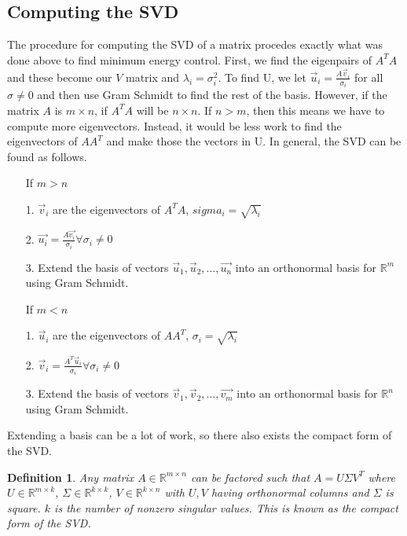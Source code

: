 \documentclass{article}
\newtheorem{definition}{Definition}
\begin{document}
\subsection{Computing the SVD}
The procedure for computing the SVD of a matrix procedes exactly what was done above to find minimum energy control.
First, we find the eigenpairs of $A^TA$ and these become our $V$ matrix and $\lambda_i=\sigma_i^2$. To find U, we let $\vec{u}_i=\frac{A\vec{v}_i}{\sigma_i}$ for all $\sigma \ne 0$ and then use Gram Schmidt to find the rest of the basis.
However, if the matrix $A$ is $m \times n$, if $A^TA$ will be $n \times n$. If $n > m$, then this means we have to compute more eigenvectors. Instead, it would be less work to find the eigenvectors of $AA^T$ and make those the vectors in U.
In general, the SVD can be found as follows.
\begin{itemize}
    \item[] If $m > n$
    \item[1. ] $\vec{v}_i$ are the eigenvectors of $A^TA$, $sigma_i=\sqrt{\lambda_i}$
    \item[2. ] $\vec{u_i}=\frac{A\vec{v_i}}{\sigma_i} \forall \sigma_i \ne 0$
    \item[3. ] Extend the basis of vectors ${\vec{u}_1, \vec{u}_2, ..., \vec{u_n}}$ into an orthonormal basis for $\mathbb{R}^m$ using Gram Schmidt.
    \item[] If $m < n$
    \item[1. ] $\vec{u}_i$ are the eigenvectors of $AA^T$, $\sigma_i=\sqrt{\lambda_i}$
    \item[2. ] $\vec{v}_i=\frac{A^T\vec{u}_i}{\sigma_i} \forall \sigma_i \ne 0$
    \item[3. ] Extend the basis of vectors ${\vec{v}_1, \vec{v}_2, ..., \vec{v_m}}$ into an orthonormal basis for $\mathbb{R}^n$ using Gram Schmidt.
\end{itemize}
Extending a basis can be a lot of work, so there also exists the compact form of the SVD.
\begin{definition}
    Any matrix $A\in \mathbb{R}^{m\times n}$ can be factored such that $A = U\Sigma V^T$
     where $U\in \mathbb{R}^{m\times k}$, $\Sigma \in \mathbb{R}^{k \times k}$, $V\in \mathbb{R}^{k \times n}$
     with $U,V$ having orthonormal columns and $\Sigma$ is square. $k$ is the number of nonzero singular values.
     This is known as the compact form of the SVD.
\end{definition}
\end{document}
